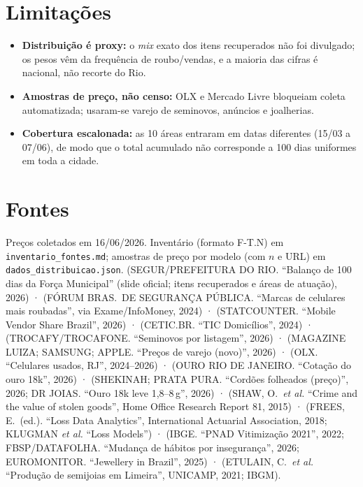 \documentclass[11pt,a4paper]{article}
\begin{document}
\section*{Limitações}
\begin{itemize}\setlength\itemsep{0.1em}
  \item \textbf{Distribuição é proxy:} o \emph{mix} exato dos itens recuperados não foi divulgado;
        os pesos vêm da frequência de roubo/vendas, e a maioria das cifras é nacional, não recorte
        do Rio.
  \item \textbf{Amostras de preço, não censo:} OLX e Mercado Livre bloqueiam coleta automatizada;
        usaram-se varejo de seminovos, anúncios e joalherias.
  \item \textbf{Cobertura escalonada:} as 10 áreas entraram em datas diferentes (15/03 a 07/06), de
        modo que o total acumulado não corresponde a 100 dias uniformes em toda a cidade.
\end{itemize}

\section*{Fontes}
\small
\noindent Preços coletados em 16/06/2026. Inventário (formato F-T.N) em \texttt{inventario\_fontes.md};
amostras de preço por modelo (com $n$ e URL) em \texttt{dados\_distribuicao.json}.
(SEGUR/PREFEITURA DO RIO. ``Balanço de 100 dias da Força Municipal'' (slide oficial; itens recuperados e áreas de atuação), 2026) ·
(FÓRUM BRAS.\ DE SEGURANÇA PÚBLICA. ``Marcas de celulares mais roubadas'', via Exame/InfoMoney, 2024) ·
(STATCOUNTER. ``Mobile Vendor Share Brazil'', 2026) ·
(CETIC.BR. ``TIC Domicílios'', 2024) ·
(TROCAFY/TROCAFONE. ``Seminovos por listagem'', 2026) ·
(MAGAZINE LUIZA; SAMSUNG; APPLE. ``Preços de varejo (novo)'', 2026) ·
(OLX. ``Celulares usados, RJ'', 2024--2026) ·
(OURO RIO DE JANEIRO. ``Cotação do ouro 18k'', 2026) ·
(SHEKINAH; PRATA PURA. ``Cordões folheados (preço)'', 2026; DR JOIAS. ``Ouro 18k leve 1,8--8\,g'', 2026) ·
(SHAW, O.\ \emph{et al.} ``Crime and the value of stolen goods'', Home Office Research Report 81, 2015) ·
(FREES, E.\ (ed.). ``Loss Data Analytics'', International Actuarial Association, 2018; KLUGMAN \emph{et al.} ``Loss Models'') ·
(IBGE. ``PNAD Vitimização 2021'', 2022; FBSP/DATAFOLHA. ``Mudança de hábitos por insegurança'', 2026; EUROMONITOR. ``Jewellery in Brazil'', 2025) ·
(ETULAIN, C.\ \emph{et al.} ``Produção de semijoias em Limeira'', UNICAMP, 2021; IBGM).
\end{document}
